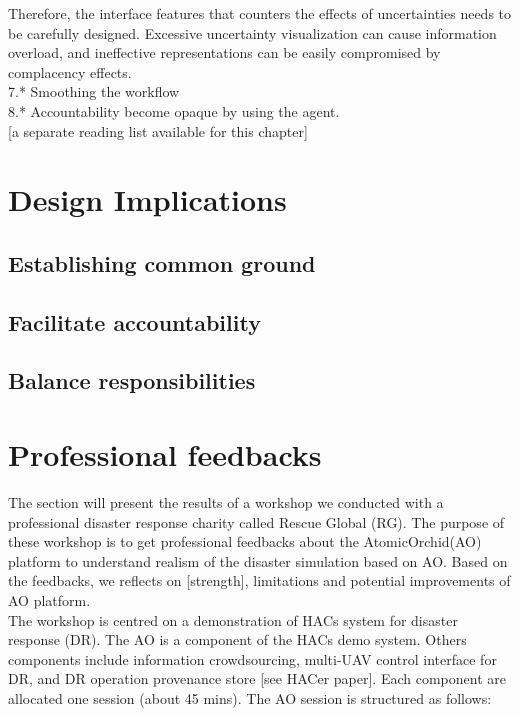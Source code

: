 Therefore, the interface features that counters the effects of uncertainties needs to be carefully designed. Excessive uncertainty visualization can cause information overload, and ineffective representations can be easily compromised by complacency effects. \\


7.*  Smoothing the workflow\\

8.* Accountability become opaque by using the agent. \\




[a separate reading list available for this chapter]\\

\section{Design Implications}
\subsection{ Establishing common ground}
\subsection{ Facilitate accountability}
\subsection{ Balance responsibilities  }



\section{Professional feedbacks}\label{sec:RGworkshopone} 

The section will present the results of a workshop we conducted with a professional disaster response charity called Rescue Global (RG). The purpose of these workshop is to get professional feedbacks about the AtomicOrchid(AO) platform to understand realism of the disaster simulation based on AO. Based on the feedbacks, we reflects on [strength], limitations and potential improvements of AO platform. \\

The workshop is centred on a demonstration of HACs system for disaster response (DR). The AO is a component of the HACs demo system. Others components include information crowdsourcing, multi-UAV control interface for DR, and DR operation provenance store [see HACer paper]. Each component are allocated one session (about 45 mins). The AO session is structured as follows:\\

